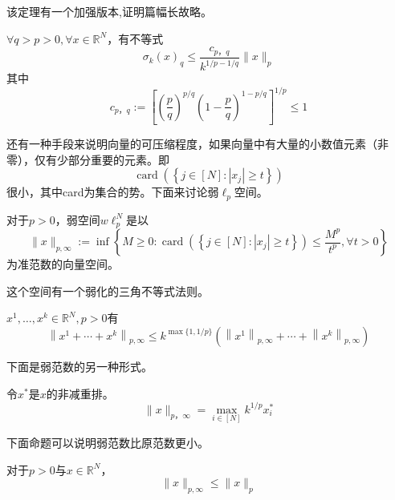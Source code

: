 该定理有一个加强版本,证明篇幅长故略。
\begin{theorem}
    $\forall q>p>0,\forall x\in \mathbb{R}^N$，有不等式
    \begin{equation}
        \sigma_k(x)_q \leq \frac{c_{p，q}}{k^{1 / p-1 / q}}\|x\|_p
    \end{equation}
    其中
    \begin{equation}
        c_{p，q}:=\left[\left(\frac{p}{q}\right)^{p / q}\left(1-\frac{p}{q}\right)^{1-p / q}\right]^{1 / p} \leq 1
    \end{equation}
\end{theorem}
还有一种手段来说明向量的可压缩程度，如果向量中有大量的小数值元素（非零），仅有少部分重要的元素。即
\begin{equation*}
    \operatorname{card}\left(\left\{j \in[N]:\left|x_j\right| \geq t\right\}\right)
\end{equation*}
很小，其中card为集合的势。下面来讨论弱$\ell_p$空间。
\begin{definition}
    对于$p>0$，弱空间$w \ell_p^N$是以
    \begin{equation}
        \|x\|_{p,\infty}:=\inf \left\{M \geq 0: \operatorname{card}\left(\left\{j \in[N]:\left|x_j\right| \geq t\right\}\right) \leq \frac{M^p}{t^p} ,\forall t>0\right\}
    \end{equation}
    为准范数的向量空间。
\end{definition}
这个空间有一个弱化的三角不等式法则。
\begin{proposition}
    $x^1,\ldots,x^k \in \mathbb{R}^N,p>0$有
    \begin{equation}
        \left\|x^1+\cdots+x^k\right\|_{p,\infty} \leq k^{\max \{1,1 / p\}}\left(\left\|x^1\right\|_{p,\infty}+\cdots+\left\|x^k\right\|_{p,\infty}\right)
    \end{equation}
\end{proposition}
下面是弱范数的另一种形式。
\begin{proposition}
令$x^*$是$x$的非减重排。
    \begin{equation}
        \|x\|_{p，\infty}=\max _{i \in[N]} k^{1 / p} x_i^*
    \end{equation}
\end{proposition}
下面命题可以说明弱范数比原范数更小。
\begin{proposition}
    对于$p>0$与$x\in \mathbb{R}^N$，
    \begin{equation}
        \|x\|_{p,\infty} \leq\|x\|_p
    \end{equation}
\end{proposition}
